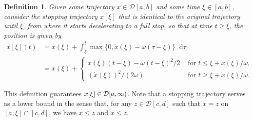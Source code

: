 \documentclass[a4paper]{article}
\theoremstyle{definition}
\theoremstyle{plain}
\newtheorem{define}{Definition\hspace{0.25em}\ignorespaces}
\newcommand*\diff{\mathop{}\!\mathrm{d}}
\begin{document}
\begin{define}\label{def:stopping-trajectory}
  Given some trajectory $x \in \mathcal{D}[a,b]$ and some time $\xi \in [a, b]$, consider the
  \emph{stopping trajectory} $x[\xi]$ that is identical to the original trajectory until
  $\xi$, from where it starts decelerating to a full stop, so that at time
  $t \geq \xi$, the position is given by
\begin{subequations}
\begin{align}
  x[\xi](t) &= x(\xi) + \int_{\xi}^{t} \max\{0, \dot{x}(\xi) - \omega(\tau-\xi) \} \diff \tau \\
                     &= x(\xi) + \begin{cases}
                                        \dot{x}(\xi)(t-\xi) - \omega(t-\xi)^{2} / 2 &\text{ for } t \leq \xi + \dot{x}(\xi) / \omega , \\
                                        {(\dot{x}(\xi))}^{2} / (2 \omega) &\text{ for } t \geq \xi + \dot{x}(\xi) / \omega .
                                        \end{cases} \label{eq:underbound}
\end{align}
\end{subequations}
\end{define}

This definition guarantees $x[\xi] \in \mathcal{D}[a,\infty)$.
%
Note that a stopping trajectory serves as a lower bound in the sense that, for any
$z \in\mathcal{D}[c,d]$ such that $x = z$ on $[a, \xi] \cap [c, d]$, we
have $x \leq z$ and $\dot{x} \leq \dot{z}$.
%

\newpage
\end{document}

